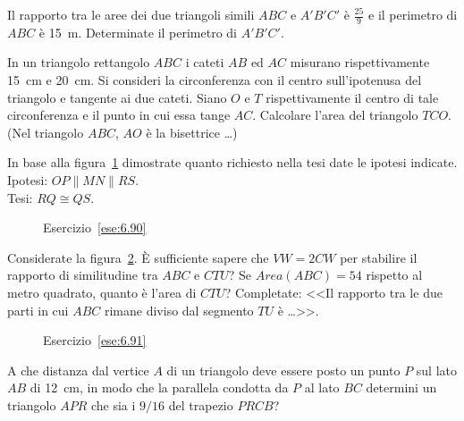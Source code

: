 \begin{multicols}{2}
\begin{esercizio}
\label{ese:6.88}
Il rapporto tra le aree dei due triangoli simili $ABC$ e $A'B'C'$ è $\frac{25}{9}$ e il perimetro di $ABC$ è 15~m. Determinate il perimetro di $A'B'C'$.
\end{esercizio}

\begin{esercizio}
\label{ese:6.89}
In un triangolo rettangolo $ABC$ i cateti $AB$ ed $AC$ misurano rispettivamente 15~cm e 20~cm. Si consideri la circonferenza con il centro sull'ipotenusa del triangolo e tangente ai due cateti. Siano $O$ e $T$ rispettivamente il centro di tale circonferenza e il punto in cui essa tange $AC$. Calcolare l'area del triangolo $TCO$. (Nel triangolo $ABC$, $AO$ è la bisettrice \ldots)
\end{esercizio}

\begin{esercizio}
\label{ese:6.90}
In base alla figura~\ref{fig:ese6.90} dimostrate quanto richiesto nella tesi date le ipotesi indicate.\\
Ipotesi: $OP\parallel MN\parallel RS$.\\
Tesi: $RQ\cong QS$.
\end{esercizio}

\begin{figure}[!htb]
	\centering
	\caption{Esercizio~\ref{ese:6.90}}\label{fig:ese6.90}
\end{figure}

\begin{esercizio}
\label{ese:6.91}
Considerate la figura~\ref{fig:ese6.91}. \`E sufficiente sapere che $VW=2CW$ per stabilire il rapporto di similitudine tra $ABC$ e $CTU$? Se $Area(ABC) = 54$ rispetto al metro quadrato, quanto è l'area di $CTU$? Completate: <<Il rapporto tra le due parti in cui $ABC$ rimane diviso dal segmento $TU$ è \ldots{}>>.
\end{esercizio}

\begin{figure}[!htb]
	\centering
	\caption{Esercizio~\ref{ese:6.91}}\label{fig:ese6.91}
\end{figure}

\begin{esercizio}
\label{ese:6.92}
A che distanza dal vertice $A$ di un triangolo deve essere posto un punto $P$ sul lato $AB$ di 12~cm, in modo che la parallela condotta da $P$ al lato $BC$ determini un triangolo $APR$ che sia i $9/16$ del trapezio $PRCB$?
\end{esercizio}


\end{multicols}
